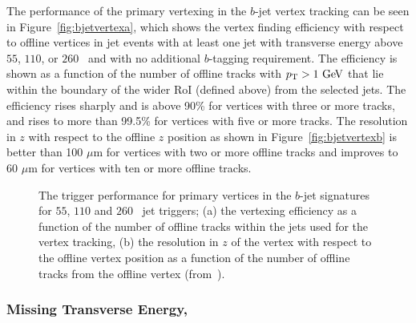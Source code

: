 					The performance of the primary vertexing in the $b$-jet vertex tracking can be seen in Figure~\ref{fig:bjetvertexa}, which shows the vertex finding efficiency with respect to 
					offline vertices in jet events with at least one jet with transverse energy above $55$, $110$, or $260$ \GeV\ and with no additional $b$-tagging requirement. The efficiency is shown 
					as a function of the number of offline tracks with $\pt>1 \GeV$ that lie within the boundary of the wider \ac{RoI} (defined above) from the selected jets. The efficiency rises sharply and 
					is above 90\% for vertices with three or more tracks, and rises to more than 99.5\% for vertices with five or more tracks. The resolution in $z$ with respect to the offline $z$ position as shown in Figure~\ref{fig:bjetvertexb} is better than 100 $\mu$m for vertices with two or more offline tracks and improves to 60 $\mu$m for vertices with ten or more offline tracks.

					\begin{figure}[!htb]
						\begin{center}
							\hspace{0.05\textwidth}
						\end{center}
						\caption{The trigger performance for primary vertices in the $b$-jet signatures for $55$, $110$ and $260$ \GeV\ jet triggers; (a) the vertexing efficiency as a function of the number of offline tracks within the jets used for the vertex tracking, (b) the resolution in $z$ of the vertex with respect to the offline vertex position as a function of the number of offline tracks from the offline vertex (from~\cite{ATLASTrigger2015}).}
						\label{fig:bjetvertex}
					\end{figure}

				\subsubsection*{Missing Transverse Energy, \met}

